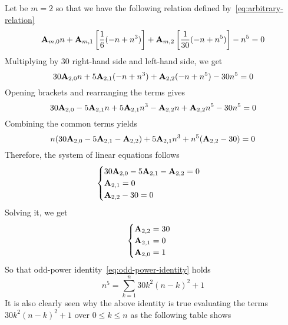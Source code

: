 \begin{example}
    Let be $m=2$ so that we have the following relation defined by~\eqref{eq:arbitrary-relation}
    \begin{equation*}
        {\mathbf{A}} \sb{m,0} n
        + {\mathbf{A}} \sb{m,1} \left[ \frac{1}{6} (-n + n^3) \right]
        + {\mathbf{A}} \sb{m,2} \left[ \frac{1}{30} (-n + n^5) \right] - n^5 = 0
    \end{equation*}
    Multiplying by $30$ right-hand side and left-hand side, we get
    \begin{equation*}
        30 {\mathbf{A}} \sb{2,0} n + 5 {\mathbf{A}} \sb{2,1} (-n + n^3) + {\mathbf{A}} \sb{2,2} (-n + n^5) - 30n^5 = 0
    \end{equation*}
    Opening brackets and rearranging the terms gives
    \begin{equation*}
        30 {\mathbf{A}} \sb{2,0} - 5 {\mathbf{A}} \sb{2,1} n + 5 {\mathbf{A}} \sb{2,1} n^3 - {\mathbf{A}} \sb{2,2} n + {\mathbf{A}} \sb{2,2} n^5 - 30n^5 = 0
    \end{equation*}
    Combining the common terms yields
    \begin{equation*}
        n (30 {\mathbf{A}} \sb{2,0} - 5 {\mathbf{A}} \sb{2,1} - {\mathbf{A}} \sb{2,2}) + 5 {\mathbf{A}} \sb{2,1} n^3 + n^5 ({\mathbf{A}} \sb{2,2} - 30) = 0
    \end{equation*}
    Therefore, the system of linear equations follows
    \begin{equation*}
        \begin{cases}
            30 {\mathbf{A}} \sb{2,0} - 5 {\mathbf{A}} \sb{2,1} - {\mathbf{A}} \sb{2,2} = 0 \\
            {\mathbf{A}} \sb{2,1} = 0 \\
            {\mathbf{A}} \sb{2,2} - 30 = 0
        \end{cases}
    \end{equation*}
    Solving it, we get
    \begin{equation*}
        \begin{cases}
            {\mathbf{A}} \sb{2,2} = 30 \\
            {\mathbf{A}} \sb{2,1} = 0 \\
            {\mathbf{A}} \sb{2,0} = 1
        \end{cases}
    \end{equation*}
    So that odd-power identity~\eqref{eq:odd-power-identity} holds
    \begin{equation*}
        n^5 = \sum_{k=1}^{n} 30k^2(n-k)^2 + 1
    \end{equation*}
    It is also clearly seen
    why the above identity is true evaluating the terms $30k^2(n-k)^2 + 1$ over $0 \leq k \leq n$ as
    the following table shows
    
\end{example}
